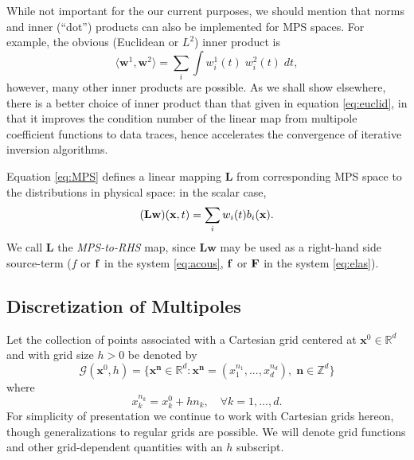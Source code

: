  While not important for the our current purposes, we should mention that norms and inner (``dot'') products can also be implemented for MPS spaces. 
For example, the obvious (Euclidean or $L^2$) inner product is
\begin{equation} \label{eq:euclid}
	\langle \mathbf w^{1}, \mathbf w^{2}\rangle = \sum_i \int w^{1}_i(t)\; w^{2}_i(t) \;dt,
\end{equation}
however, many other inner products are possible. 
As we shall show elsewhere, there is a better choice of inner product than that given in equation \ref{eq:euclid}, in that it improves the condition number of the linear map from multipole coefficient functions to data traces, hence accelerates the convergence of iterative inversion algorithms.

Equation \ref{eq:MPS} defines a linear mapping $\mathbf L$ from corresponding MPS space to the distributions in physical space: in the scalar case,
\begin{equation} \label{eq:mpstorhsdefn}
	(\mathbf L\mathbf w)({\bf x},t)= \sum_{i} w_i(t) b_i(\mathbf x).
\end{equation}
We call $\mathbf L$ the {\em MPS-to-RHS} map, since $\mathbf L\mathbf w$ may be used as a right-hand side source-term ($f$ or ${\bf f}$ in the system \ref{eq:acous}, ${\bf f}$ or ${\bf F}$ in the system \ref{eq:elas}).


\subsection{Discretization of Multipoles}

Let the collection of points associated with a Cartesian grid centered at $\mathbf x^0\in\mathbb R^d$ and with grid size $h>0$ be denoted by
\[
	\mathcal G(\mathbf x^0,h) = \{ \mathbf x^{\mathbf n}\in\mathbb R^d : 
		\mathbf x^{\mathbf n}=(x_{1}^{n_1},...,x_{d}^{n_d}), \; \mathbf n\in\mathbb Z^d\}
\] 
where
\[
	x_{k}^{n_k} = x_{k}^0 + hn_k, \quad \forall k=1,...,d.
\]
For simplicity of presentation we continue to work with Cartesian grids hereon, though generalizations to regular grids are possible.
We will denote grid functions and other grid-dependent quantities with an $h$ subscript.

